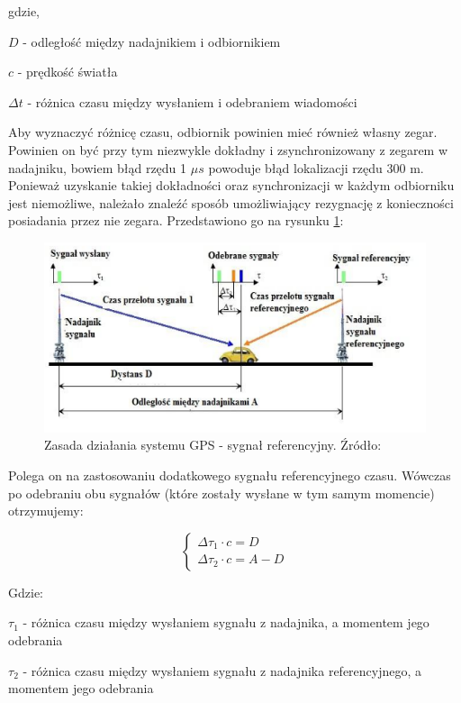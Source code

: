 gdzie,

$D$ - odległość między nadajnikiem i odbiornikiem

$c$ - prędkość światła

$\Delta t$ - różnica czasu między wysłaniem i odebraniem wiadomości

Aby wyznaczyć różnicę czasu, odbiornik powinien mieć również własny zegar. Powinien on być przy tym niezwykle dokładny i zsynchronizowany z zegarem w nadajniku, bowiem błąd rzędu 1 $\mu s$ powoduje błąd lokalizacji rzędu 300 m. Ponieważ uzyskanie takiej dokładności oraz synchronizacji w każdym odbiorniku jest niemożliwe, należało znaleźć sposób umożliwiający rezygnację z konieczności posiadania przez nie zegara. Przedstawiono go na rysunku \ref{fig:image_gps_basics2}:

\begin{figure}[H]
	\centering
	\includegraphics[width=12cm]{img/theory/GPS/gps_basics2.png}
	\caption{Zasada działania systemu GPS - sygnał referencyjny. Źródło: \cite{inzynierka}}
	\label{fig:image_gps_basics2}
\end{figure}

Polega on na zastosowaniu dodatkowego sygnału referencyjnego czasu. Wówczas po odebraniu obu sygnałów (które zostały wysłane w tym samym momencie) otrzymujemy:

\begin{equation}
\begin{cases}
\Delta \tau_1 \cdot c = D \\ 
\Delta \tau_2 \cdot c = A - D
\end{cases}
\end{equation}

Gdzie:

$\tau_1$ - różnica czasu między wysłaniem sygnału z nadajnika, a momentem jego odebrania

$\tau_2$ - różnica czasu między wysłaniem sygnału z nadajnika referencyjnego, a momentem jego odebrania

